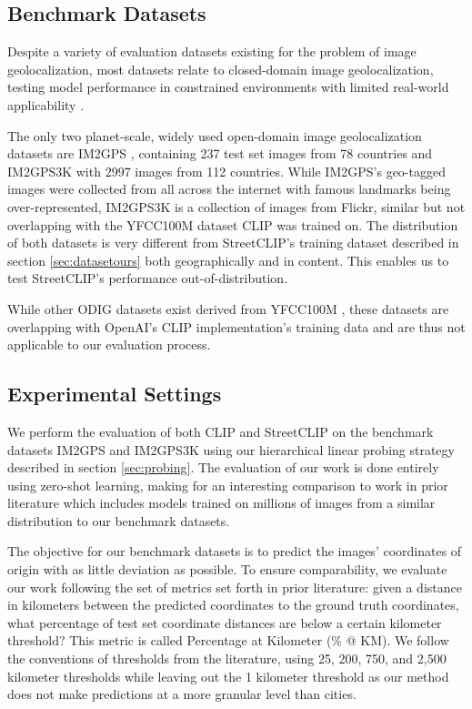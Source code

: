 \documentclass{article}
\renewcommand{\cite}[1]{\citep{#1}}
\begin{document}
\subsection{Benchmark Datasets}

Despite a variety of evaluation datasets existing for the problem of image geolocalization, most datasets relate to closed-domain image geolocalization, testing model performance in constrained environments with limited real-world applicability \cite{Berton_2022_CVPR}. 

The only two planet-scale, widely used open-domain image geolocalization datasets are IM2GPS \cite{hays_2008}, containing 237 test set images from 78 countries and IM2GPS3K \cite{vo_et_al} with 2997 images from 112 countries. While IM2GPS's geo-tagged images were collected from all across the internet with famous landmarks being over-represented, IM2GPS3K is a collection of images from Flickr, similar but not overlapping with the YFCC100M \cite{thomee_2016} dataset CLIP was trained on. The distribution of both datasets is very different from StreetCLIP's training dataset described in section \ref{sec:datasetours} both geographically and in content. This enables us to test StreetCLIP's performance out-of-distribution.



While other ODIG datasets exist derived from YFCC100M \cite{thomee_2016}, these datasets are overlapping with OpenAI's CLIP implementation's training data and are thus not applicable to our evaluation process.

\subsection{Experimental Settings}
We perform the evaluation of both CLIP \cite{clip_large} and StreetCLIP on the benchmark datasets IM2GPS and IM2GPS3K using our hierarchical linear probing strategy described in section \ref{sec:probing}. The evaluation of our work is done entirely using zero-shot learning, making for an interesting comparison to work in prior literature which includes models trained on millions of images from a similar distribution to our benchmark datasets.

The objective for our benchmark datasets is to predict the images' coordinates of origin with as little deviation as possible. To ensure comparability, we evaluate our work following the set of metrics set forth in prior literature: given a distance in kilometers between the predicted coordinates to the ground truth coordinates, what percentage of test set coordinate distances are below a certain kilometer threshold? This metric is called Percentage at Kilometer (\% @ KM). We follow the conventions of thresholds from the literature, using 25, 200, 750, and 2,500 kilometer thresholds while leaving out the 1 kilometer threshold as our method does not make predictions at a more granular level than cities.
\end{document}
